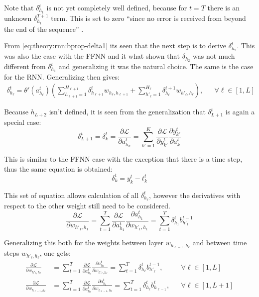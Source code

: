 Note that $\delta_{h_1}^{t}$ is not yet completely well defined, because for $t = T$ there is an unknown $\delta_{h_1}^{T+1}$ term. This is set to zero ``since no error is received from beyond the end of the sequence'' \cite{alexgraves}.

From \eqref{eq:theory:rnn:bprop-delta1} its seen that the next step is to derive $\delta_{h_2}^t$. This was also the case with the FFNN and it what shown that $\delta_{h_2}$ was not much different from $\delta_{h_1}^{t}$ and generalizing it was the natural choice. The same is the case for the RNN. Generalizing then gives:
\begin{equation}
\begin{aligned}
\delta_{h_\ell}^t = \theta'(a_{h_\ell}^t) \left( \sum_{h_{\ell+1}=1}^{H_{\ell+1}} \delta_{h_{\ell +1}}^t w_{h_\ell, h_{\ell + 1}}
+ \sum_{h'_\ell=1}^{H_\ell} \delta_{h_\ell}^{t+1} w_{h'_\ell, h_\ell} \right), && \forall \ell \in [1, L]
\end{aligned}
\end{equation}

Because $h_{L+2}$ isn't defined, it is seen from the generalization that $\delta_{L+1}^t$ is again a special case:
\begin{equation}
\delta_{L+1}^t = \delta_{k}^t = \frac{\partial \mathcal{L}}{\partial a_{h_k}^t} = \sum_{k'=1}^K \frac{\partial \mathcal{L}}{\partial y_{k'}^t} \frac{\partial y_{k'}^t}{\partial a_k^t}
\end{equation}

This is similar to the FFNN case with the exception that there is a time step, thus the same equation is obtained:
\begin{equation}
\delta_{k}^t = y_k^t - t_k^t
\end{equation}

This set of equation allows calculation of all $\delta_{h_\ell}^t$, however the derivatives with respect to the other weight still need to be considered.
\begin{equation}
\frac{\partial \mathcal{L}}{\partial w_{h'_1, h_1}} = \sum_{t=1}^T \frac{\partial \mathcal{L}}{\partial a_{h_1}^t} \frac{\partial a_{h_1}^t}{\partial w_{h'_1, h_1}} = \sum_{t=1}^T \delta_{h_1}^t b_{h'_1}^{t-1}
\end{equation}

Generalizing this both for the weights between layer $w_{h_{\ell - 1}, h_\ell}$ and between time steps $w_{h'_{\ell}, h_\ell}$, one gets:
\begin{align}
\frac{\partial \mathcal{L}}{\partial w_{h'_\ell, h_\ell}} &= \sum_{t=1}^T \frac{\partial \mathcal{L}}{\partial a_{h_\ell}^t} \frac{\partial a_{h_\ell}^t}{\partial w_{h'_\ell, h_\ell}} = \sum_{t=1}^T \delta_{h_\ell}^t b_{h'_\ell}^{t-1}, && \forall \ell \in [1, L] \\
\frac{\partial \mathcal{L}}{\partial w_{h_{\ell - 1}, h_\ell}} &= \sum_{t=1}^T \frac{\partial \mathcal{L}}{\partial a_{h_\ell}^t} \frac{\partial a_{h_\ell}^t}{\partial w_{h_{\ell-1}, h_\ell}} = \sum_{t=1}^T \delta_{h_\ell}^t b_{h_{\ell-1}}^t, && \forall \ell \in [1, L + 1] 
\end{align}
